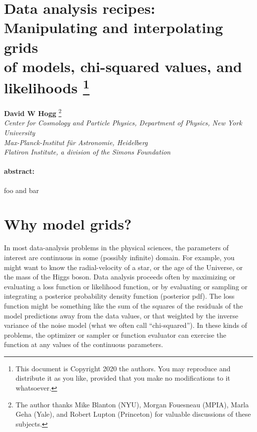 \documentclass[12pt]{article}
\begin{document}
\section*{Data analysis recipes:\\
          Manipulating and interpolating grids\\
          of models, chi-squared values, and likelihoods%
\footnote{This document is Copyright 2020 the authors. You may
  reproduce and distribute it as you like, provided that you make no
  modifications to it whatsoever.}}

\noindent
\textbf{David W Hogg}%
\footnote{The author thanks
  Mike Blanton (NYU),
  Morgan Fouesneau (MPIA),
  Marla Geha (Yale), and
  Robert Lupton (Princeton)
for valuable discussions of these subjects.}\\
\textsl{\footnotesize%
Center for Cosmology and Particle Physics, Department of Physics, New York University\\
Max-Planck-Institut f\"ur Astronomie, Heidelberg\\
Flatiron Institute, a division of the Simons Foundation}

\paragraph{abstract:}
foo and bar

\section{Why model grids?}

In most data-analysis problems in the physical sciences, the
parameters of interest are continuous in some (possibly infinite)
domain.
For example, you might want to know the radial-velocity of a star, or
the age of the Universe, or the mass of the Higgs boson.
Data analysis proceeds often by maximizing or evaluating a loss
function or likelihood function, or by evaluating or sampling or
integrating a posterior probability density function (posterior pdf).
The loss function might be something like the sum of the squares of
the residuals of the model predictions away from the data values, or
that weighted by the inverse variance of the noise model (what we
often call ``chi-squared'').
In these kinds of problems, the optimizer or sampler or function
evaluator can exercise the function at any values of the continuous
parameters.
\end{document}
